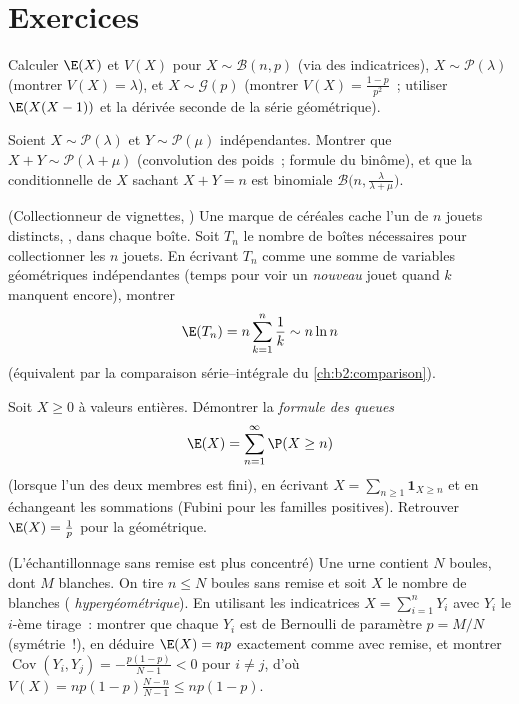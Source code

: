 \section{Exercices}

\begin{exercise}[$\star$]\label{exo:b2:randomvar:1}
Calculer $\E(X)$ et $V(X)$ pour $X \sim \mathcal{B}(n, p)$ (via
des indicatrices), $X \sim \mathcal{P}(\lambda)$ (montrer $V(X) =
\lambda$), et $X \sim \mathcal{G}(p)$ (montrer $V(X) =
\frac{1-p}{p^2}$~; utiliser $\E(X(X-1))$ et la dérivée seconde de
la série géométrique).
\end{exercise}

\begin{exercise}[$\star$]\label{exo:b2:randomvar:2}
Soient $X \sim \mathcal{P}(\lambda)$ et $Y \sim \mathcal{P}(\mu)$
indépendantes. Montrer que $X + Y \sim \mathcal{P}(\lambda + \mu)$
(convolution des poids~; formule du binôme), et que la
 conditionnelle de $X$ sachant $X + Y = n$ est binomiale
$\mathcal{B}\bigl(n, \frac{\lambda}{\lambda + \mu}\bigr)$.
\end{exercise}

\begin{exercise}[$\star$]\label{exo:b2:randomvar:3}
(Collectionneur de vignettes, ) Une marque de céréales cache l'un de $n$
jouets distincts, , dans chaque boîte. Soit $T_n$ le nombre de
boîtes nécessaires pour collectionner les $n$ jouets. En écrivant $T_n$ comme une somme de
variables géométriques indépendantes (temps pour voir un \emph{nouveau} jouet quand
$k$ manquent encore), montrer
\[
\E(T_n) = n\sum_{k=1}^{n}\frac{1}{k} \sim n\ln n
\]
(équivalent par la comparaison série--intégrale du
\cref{ch:b2:comparison}).
\end{exercise}

\begin{exercise}[$\star\star$]\label{exo:b2:randomvar:4}
Soit $X \geq 0$ à valeurs entières. Démontrer la \emph{formule des queues}
\[
\E(X) = \sum_{n=1}^{\infty} \P(X \geq n)
\]
(lorsque l'un des deux membres est fini), en écrivant $X =
\sum_{n\geq1}\mathbf{1}_{X \geq n}$ et en échangeant les sommations
(Fubini pour les familles positives). Retrouver $\E(X) = \frac1p$ pour
la  géométrique.
\end{exercise}

\begin{exercise}[$\star\star$]\label{exo:b2:randomvar:5}
(L'échantillonnage sans remise est plus concentré) Une urne contient $N$
boules, dont $M$ blanches. On tire $n \leq N$ boules sans remise et
soit $X$ le nombre de blanches ( \emph{hypergéométrique}). En utilisant
les indicatrices $X = \sum_{i=1}^n Y_i$ avec $Y_i$ le $i$-ème tirage~:
montrer que chaque $Y_i$ est de Bernoulli de paramètre $p = M/N$ (symétrie~!),
en déduire $\E(X) = np$ exactement comme avec remise, et montrer
$\operatorname{Cov}(Y_i, Y_j) = -\frac{p(1-p)}{N-1} < 0$ pour $i
\neq j$, d'où $V(X) = np(1-p)\frac{N - n}{N - 1} \leq np(1-p)$.
\end{exercise}

